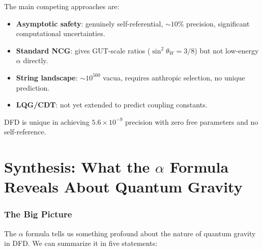 \documentclass[12pt,a4paper]{article}
\begin{document}
\begin{tcolorbox}[colback=blue!5!white, colframe=blue!60!black, title=Answer to Question 6]
The main competing approaches are:
\begin{itemize}
\item \textbf{Asymptotic safety}: genuinely self-referential, $\sim 10\%$ precision, significant computational uncertainties.
\item \textbf{Standard NCG}: gives GUT-scale ratios ($\sin^2\theta_W = 3/8$) but not low-energy $\alpha$ directly.
\item \textbf{String landscape}: $\sim 10^{500}$ vacua, requires anthropic selection, no unique prediction.
\item \textbf{LQG/CDT}: not yet extended to predict coupling constants.
\end{itemize}
DFD is unique in achieving $5.6 \times 10^{-9}$ precision with zero free parameters and no self-reference.
\end{tcolorbox}


\part{Synthesis: What the $\alpha$ Formula Reveals About Quantum Gravity}
\label{part:synthesis}

\section{The Big Picture}

The $\alpha$ formula tells us something profound about the nature of quantum gravity in DFD. We can summarize it in five statements:
\end{document}
